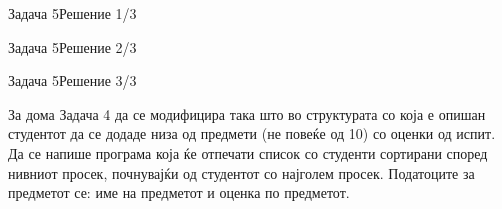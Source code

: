 \begin{frame}[fragile]{Задача 5}{Решение 1/3}

\end{frame}

\begin{frame}[fragile]{Задача 5}{Решение 2/3}

\end{frame}

\begin{frame}[fragile]{Задача 5}{Решение 3/3}

\end{frame}

\begin{frame}{За дома}
Задача 4 да се модифицира така што во структурата со која е опишан студентот да
се додаде низа од предмети (не повеќе од 10) со оценки од испит. Да се напише
програма која ќе отпечати список со студенти сортирани според нивниот просек,
почнувајќи од студентот со најголем просек. Податоците за предметот се: име на
предметот и оценка по предметот.
\end{frame}

